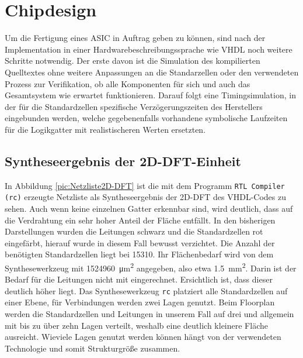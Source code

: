  
 
 \section{Chipdesign}
Um die Fertigung eines ASIC in Auftrag geben zu können, sind nach der Implementation in einer Hardwarebeschreibungssprache wie VHDL noch weitere Schritte notwendig.
Der erste davon ist die Simulation des kompilierten Quelltextes ohne weitere Anpassungen an die Standarzellen oder den verwendeten Prozess zur Verifikation, ob alle 
Komponenten für sich und auch das Gesamtsystem wie erwartet funktionieren.
Darauf folgt eine Timingsimulation, in der für die Standardzellen spezifische Verzögerungszeiten des Herstellers eingebunden werden, welche gegebenenfalls vorhandene 
symbolische Laufzeiten für die Logikgatter mit realistischeren Werten ersetzten.



 
 \subsection{Syntheseergebnis der 2D-DFT-Einheit}
 In Abbildung \ref{pic:Netzliste2D-DFT} ist die mit dem Programm \texttt{RTL Compiler (rc)} erzeugte Netzliste als Syntheseergebnis der 2D-DFT des VHDL-Codes zu sehen.
 Auch wenn keine einzelnen Gatter erkennbar sind, wird deutlich, dass auf die Verdrahtung ein sehr hoher Anteil der Fläche entfällt.
 In den bisherigen Darstellungen wurden die Leitungen schwarz und die Standardzellen rot eingefärbt, hierauf wurde in diesem Fall bewusst verzichtet.
 Die Anzahl der benötigten Standardzellen liegt bei \num{15310}. Ihr Flächenbedarf wird von dem Synthesewerkzeug mit \SI{1524960}{\um^2} angegeben, also etwa 
 \SI{1,5}{mm^2}. Darin ist der Bedarf für die Leitungen nicht mit eingerechnet. Ersichtlich ist, dass dieser deutlich höher liegt. 
 Das Synthesewerkzeug \texttt{rc} platziert alle Standardzellen auf einer Ebene, für Verbindungen werden zwei Lagen genutzt.
 Beim Floorplan werden die Standardzellen und Leitungen in unserem Fall auf drei und allgemein mit bis zu über zehn Lagen verteilt,
 weshalb eine deutlich kleinere Fläche ausreicht. Wieviele Lagen genutzt werden können hängt von der verwendeten Technologie und somit Strukturgröße zusammen.
 

